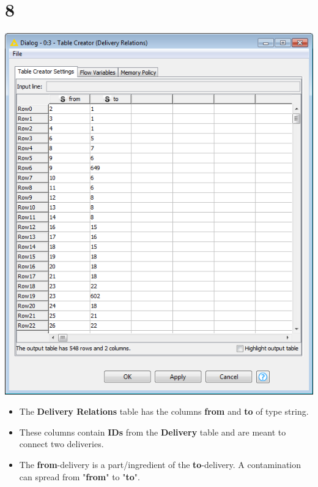 \documentclass[10pt]{beamer}
\begin{document}
\section{8}
\begin{frame}
	\begin{center}
  		\includegraphics[height=0.6\textheight]{8.png}
	\end{center}
	\begin{itemize}
		\item The \textbf{Delivery Relations} table has the columns \textbf{from} and \textbf{to} of type string.
		\item These columns contain \textbf{IDs} from the \textbf{Delivery} table and are meant to connect two deliveries.
		\item The \textbf{from}-delivery is a part/ingredient of the \textbf{to}-delivery. A contamination can spread from "\textbf{from}" to "\textbf{to}".
	\end{itemize}
\end{frame}
\end{document}
